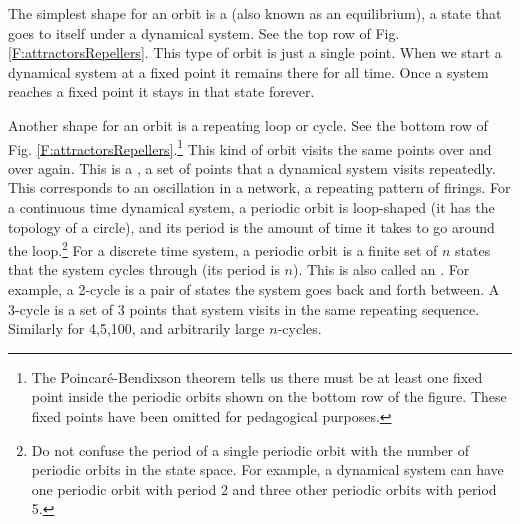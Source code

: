    The simplest shape for an orbit is a  (also known as 
an equilibrium), a state that goes to itself under a dynamical system. See the 
top row of Fig. \ref{F:attractorsRepellers}.  This type of orbit is just a 
single point.  When we start a dynamical system at a fixed point it remains 
there for all time. Once a system reaches a fixed point it stays in that state 
forever. 

   Another shape for an orbit is a repeating loop or cycle. See the bottom row 
of Fig. \ref{F:attractorsRepellers}.\footnote{The Poincar\'{e}-Bendixson 
theorem tells us there must be at least one fixed point inside the periodic 
orbits shown on the bottom row of the figure. These fixed points have been 
omitted for pedagogical purposes.}  This kind of orbit visits the 
same points over and over again. This is a , a set of 
points that a dynamical system visits repeatedly. This corresponds to an oscillation 
in a network, a repeating pattern of firings.  For a continuous time dynamical 
system, a periodic orbit is loop-shaped (it has the topology of a circle), and 
its period is the amount of time it takes to go around the loop.\footnote{Do not 
confuse the period of a single periodic orbit with the number of periodic 
orbits in the state space. For example, a dynamical system can have one 
periodic orbit with period 2 and three other periodic orbits with period 5.}
For a discrete time system, a periodic orbit is a finite set of $n$ states that 
the system cycles through (its period is $n$). This is also called an 
.  For example, a 2-cycle is a pair of states the system goes 
back and forth between.  A 3-cycle is a set of 3 points that system visits in 
the same repeating sequence.  Similarly for 4,5,100, and arbitrarily large 
$n$-cycles.  


